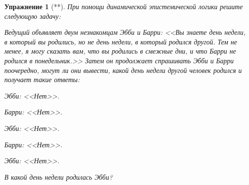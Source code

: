 \documentclass[11pt]{article}
\newtheorem{exercise}[theorem]{Упражнение}
\begin{document}
\begin{exercise}[**] При помощи динамической эпистемической логики решите следующую задачу:
	
Ведущий объявляет двум незнакомцам Эбби и Барри:
<<Вы знаете день недели, в который вы родились, но не день недели, в который родился другой. Тем не менее, я могу сказать вам, что вы родились в смежные дни, и что Барри не родился в
понедельник.>> Затем он продолжает спрашивать Эбби и Барри поочередно, могут ли они вывести, какой день недели другой человек родился и получает такие ответы:

\begin{description}
\item Эбби: <<Нет>>. 
\item Барри: <<Нет>>.
\item Эбби: <<Нет>>. 
\item Барри: <<Нет>>. 
\item Эбби: <<Нет>>.
\end{description}

\begin{center}
В какой день недели родилась Эбби?	
\end{center}
\end{exercise}
\end{document}
